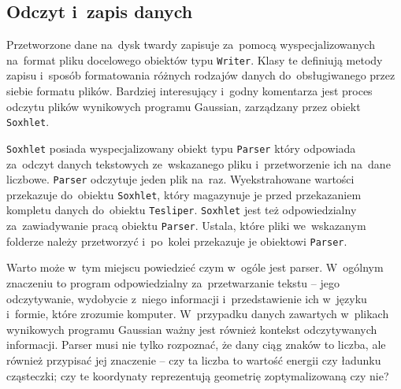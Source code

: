\subsection{Odczyt i~zapis danych}\label{implementation:parsing}
Przetworzone dane na~dysk twardy \tesliper{} zapisuje za~pomocą wyspecjalizowanych na~format
  pliku docelowego obiektów typu \texttt{Writer}.
Klasy te definiują metody zapisu i~sposób formatowania różnych rodzajów danych do~obsługiwanego
  przez siebie formatu plików.
Bardziej interesujący i~godny komentarza jest proces odczytu plików wynikowych programu Gaussian,
  zarządzany przez obiekt \texttt{Soxhlet}.

\texttt{Soxhlet} posiada wyspecjalizowany obiekt typu \texttt{Parser}
  który odpowiada za~odczyt danych tekstowych ze~wskazanego pliku i~przetworzenie ich
  na~dane liczbowe.
\texttt{Parser} odczytuje jeden plik na~raz.
Wyekstrahowane wartości przekazuje do~obiektu \texttt{Soxhlet}, który magazynuje je przed
  przekazaniem kompletu danych do~obiektu \texttt{Tesliper}.
\texttt{Soxhlet} jest też odpowiedzialny za~zawiadywanie pracą obiektu \texttt{Parser}.
Ustala, które pliki we~wskazanym folderze należy przetworzyć i~po~kolei przekazuje je
  obiektowi \texttt{Parser}.

Warto może w~tym miejscu powiedzieć czym w~ogóle jest parser.
W~ogólnym znaczeniu to program odpowiedzialny za~przetwarzanie tekstu
  \--- jego odczytywanie, wydobycie z~niego informacji i~przedstawienie ich w~języku i~formie,
  które zrozumie komputer.
W~przypadku danych zawartych w~plikach wynikowych programu Gaussian ważny jest również kontekst
  odczytywanych informacji.
Parser musi nie tylko rozpoznać, że dany ciąg znaków to liczba, ale również przypisać jej znaczenie
  \--- czy ta liczba to wartość energii czy ładunku cząsteczki; czy te koordynaty reprezentują
  geometrię zoptymalizowaną czy nie?

